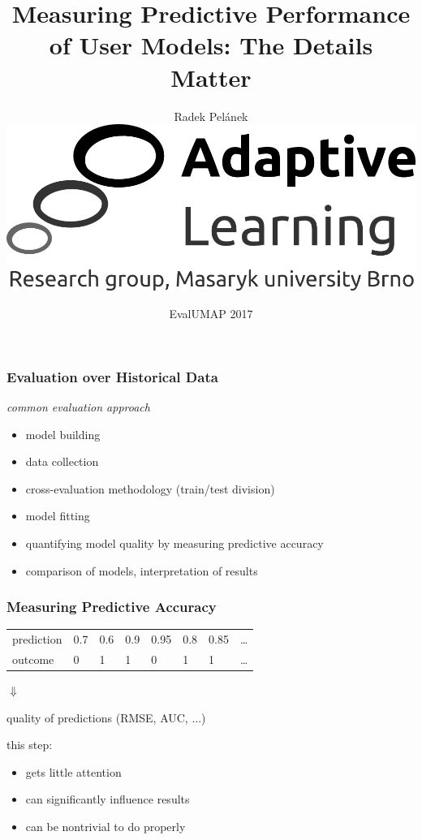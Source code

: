 \documentclass[bigger]{beamer}
\title{Measuring Predictive Performance of User Models: The Details Matter}
\author{Radek Pel\'anek\\[10mm]
\includegraphics[width=.3\linewidth]{al-logo}
}
\date{EvalUMAP 2017}
\begin{document}
\frame{\titlepage}





\begin{frame}
  \frametitle{Evaluation over Historical Data}

  \emph{common evaluation approach}

  \begin{itemize}
  \item model building
  \item data collection
  \item cross-evaluation methodology (train/test division)
  \item model fitting
  \item \alert{quantifying model quality by measuring predictive accuracy}
  \item comparison of models, interpretation of results
  \end{itemize}
\end{frame}

\begin{frame}
  \frametitle{Measuring Predictive Accuracy}

    \begin{block}{}
  \begin{center}
      \begin{tabular}{llllllll}
        \midrule
        prediction & 0.7 & 0.6 & 0.9 & 0.95 & 0.8 & 0.85 & \ldots \\
        outcome & 0 & 1 & 1 & 0 & 1 & 1 & \ldots \\
        \midrule
      \end{tabular}
    
      \medskip

      $\Downarrow$

      \medskip

      quality of predictions (RMSE, AUC, ...)
  \end{center}  
    \end{block}

    \medskip    

    this step:
    \begin{itemize}
    \item gets little attention
    \item can significantly influence results
    \item can be nontrivial to do properly
    \end{itemize}
\end{frame}
\end{document}

